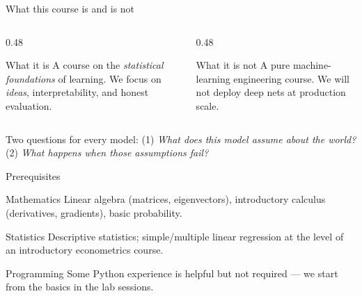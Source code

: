 \documentclass[aspectratio=169,11pt]{beamer}
\begin{document}
\begin{frame}{What this course is and is not}
  \begin{columns}[T]
    \begin{column}{0.48\textwidth}
      \begin{block}{What it is}
        A course on the \emph{statistical foundations} of learning.
        We focus on \emph{ideas}, interpretability, and honest
        evaluation.
      \end{block}
    \end{column}
    \begin{column}{0.48\textwidth}
      \begin{alertblock}{What it is not}
        A pure machine-learning engineering course. We will not deploy
        deep nets at production scale.
      \end{alertblock}
    \end{column}
  \end{columns}
  \begin{takeaway}
    Two questions for every model: (1) \emph{What does this model
    assume about the world?} (2) \emph{What happens when those
    assumptions fail?}
  \end{takeaway}
\end{frame}

\begin{frame}{Prerequisites}
  \begin{block}{Mathematics}
    Linear algebra (matrices, eigenvectors), introductory calculus
    (derivatives, gradients), basic probability.
  \end{block}
  \begin{block}{Statistics}
    Descriptive statistics; simple/multiple linear regression at the
    level of an introductory econometrics course.
  \end{block}
  \begin{block}{Programming}
    Some Python experience is helpful but not required --- we start
    from the basics in the lab sessions.
  \end{block}
\end{frame}
\end{document}
